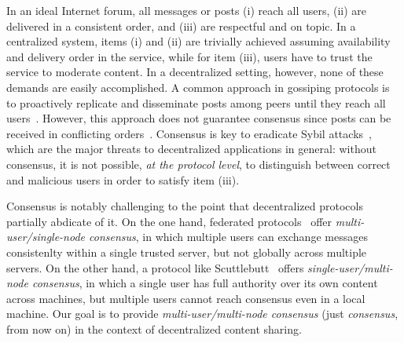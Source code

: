 \documentclass[12pt]{article}
\begin{document}
In an ideal Internet forum, all messages or posts
(i)   reach all users,
(ii)  are delivered in a consistent order, and
(iii) are respectful and on topic.
In a centralized system, items (i) and (ii) are trivially achieved assuming
availability and delivery order in the service, while for item (iii), users
have to trust the service to moderate content.
In a decentralized setting, however, none of these demands are easily
accomplished.
A common approach in gossiping protocols is to proactively replicate and
disseminate posts among peers until they reach all
users~\cite{p2p.survey,p2p.byz}.
However, this approach does not guarantee consensus since posts can be received
in conflicting orders~\cite{p2p.intention,p2p.dvcs}.
%
Consensus is key to eradicate Sybil attacks~\cite{p2p.sybil}, which are the
major threats to decentralized applications in general: without consensus, it
is not possible, \emph{at the protocol level}, to distinguish between correct
and malicious users in order to satisfy item (iii).

Consensus is notably challenging to the point that decentralized protocols
partially abdicate of it.
%
On the one hand, federated protocols~\cite{p2p.ecosystem} offer
\emph{multi-user/single-node consensus}, in which multiple users can exchange
messages consistenlty within a single trusted server, but not globally across
multiple servers.
%
On the other hand, a protocol like Scuttlebutt~\cite{p2p.scuttlebutt} offers
\emph{single-user/multi-node consensus}, in which a single user has full
authority over its own content across machines, but multiple users cannot reach
consensus even in a local machine.
%
Our goal is to provide \emph{multi-user/multi-node consensus} (just
\emph{consensus}, from now on) in the context of decentralized content sharing.
\end{document}
